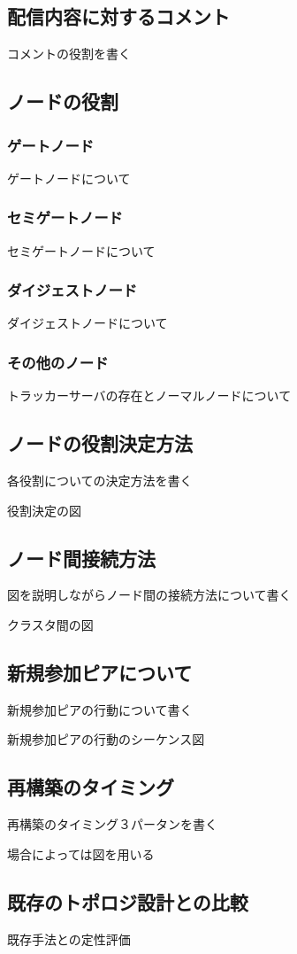 \subsection{配信内容に対するコメント}
コメントの役割を書く

\subsection{ノードの役割}
\subsubsection{ゲートノード}
ゲートノードについて

\subsubsection{セミゲートノード}
セミゲートノードについて

\subsubsection{ダイジェストノード}
ダイジェストノードについて

\subsubsection{その他のノード}
トラッカーサーバの存在とノーマルノードについて

\subsection{ノードの役割決定方法}
各役割についての決定方法を書く

役割決定の図

\subsection{ノード間接続方法}

図を説明しながらノード間の接続方法について書く

クラスタ間の図

\subsection{新規参加ピアについて}
新規参加ピアの行動について書く

新規参加ピアの行動のシーケンス図

\subsection{再構築のタイミング}
再構築のタイミング３パータンを書く

場合によっては図を用いる

\subsection{既存のトポロジ設計との比較}

既存手法との定性評価


